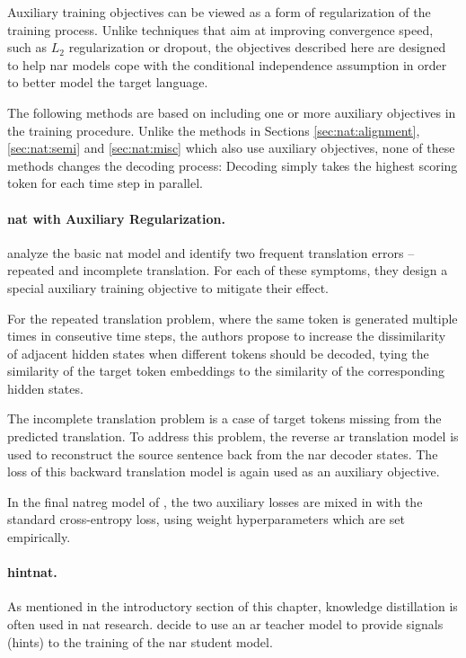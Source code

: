 Auxiliary training objectives can be viewed as a form of regularization of the
training process. Unlike techniques that aim at improving convergence speed,
such as $L_2$ regularization or dropout, the objectives described here are
designed to help \acl{nar} models cope with the conditional independence
assumption in order to better model the target language.

The following methods are based on including one or more auxiliary objectives
in the training procedure. Unlike the methods in Sections
\ref{sec:nat:alignment}, \ref{sec:nat:semi} and \ref{sec:nat:misc} which also
use auxiliary objectives, none of these methods changes the decoding process:
Decoding simply takes the highest scoring token for each time step in parallel.

\paragraph{\Ac{nat} with Auxiliary Regularization.}
\citet{wang-etal-2019-nonautoregressive} analyze the basic \ac{nat} model
\citep{gu2017nonautoregressive} and identify two frequent translation errors --
repeated and incomplete translation. For each of these symptoms, they design a
special auxiliary training objective to mitigate their effect.

For the repeated translation problem, where the same token is generated
multiple times in conseutive time steps, the authors propose to increase the
dissimilarity of adjacent hidden states when different tokens should be
decoded, tying the similarity of the target token embeddings to the similarity
of the corresponding hidden states.

The incomplete translation problem is a case of target tokens missing from the
predicted translation. To address this problem, the reverse \ac{ar} translation
model is used to reconstruct the source sentence back from the \ac{nar} decoder
states. The loss of this backward translation model is again used as an
auxiliary objective.

In the final \acs{natreg} model of \citet{wang-etal-2019-nonautoregressive},
the two auxiliary losses are mixed in with the standard cross-entropy loss,
using weight hyperparameters which are set empirically.

\paragraph{\Acs{hintnat}.} As mentioned in the introductory section of this
chapter, knowledge distillation is often used in \ac{nat}
research. \citet{li-etal-2019-hint} decide to use an \ac{ar} teacher model to
provide signals (hints) to the training of the \ac{nar} student model.


